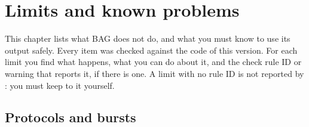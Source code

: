 \chapter{Limits and known problems}
\label{ch:limits}

This chapter lists what BAG does not do, and what you must know to use its output
safely. Every item was checked against the code of this version. For each limit you find
what happens, what you can do about it, and the check rule ID or warning that reports it,
if there is one. A limit with no rule ID is not reported by : you must
keep to it yourself.

\section{Protocols and bursts}

